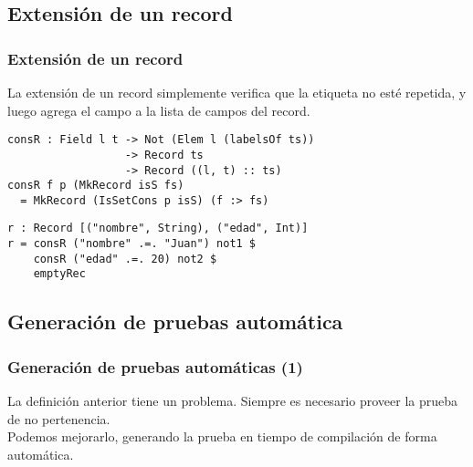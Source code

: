 \documentclass{beamer}
\begin{document}
\subsection{Extensión de un record}

\begin{frame}[fragile]
\frametitle{Extensión de un record}

La extensión de un record simplemente verifica que la etiqueta no esté repetida, y luego agrega el campo a la lista de campos del record.

\pause

\begin{definition}
\begin{verbatim}
consR : Field l t -> Not (Elem l (labelsOf ts))
                  -> Record ts
                  -> Record ((l, t) :: ts)
consR f p (MkRecord isS fs)
  = MkRecord (IsSetCons p isS) (f :> fs)
\end{verbatim}
\end{definition}

\pause
\begin{example}
\begin{verbatim}
r : Record [("nombre", String), ("edad", Int)]
r = consR ("nombre" .=. "Juan") not1 $
    consR ("edad" .=. 20) not2 $
    emptyRec
\end{verbatim}
\end{example}
\end{frame}

\subsection{Generación de pruebas automática}

\begin{frame}[fragile]
\frametitle{Generación de pruebas automáticas (1)}

La definición anterior tiene un problema. Siempre es necesario proveer la prueba de no pertenencia. \\

Podemos mejorarlo, generando la prueba en tiempo de compilación de forma automática.

\end{frame}
\end{document}
